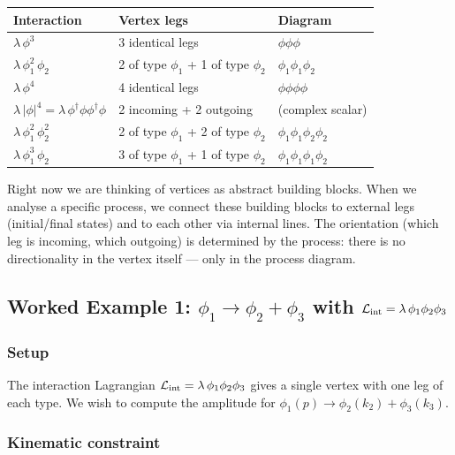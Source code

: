 \documentclass[../main.tex]{subfiles}
\begin{document}
\begin{center}
\renewcommand{\arraystretch}{1.4}
\begin{tabular}{lll}
  \toprule
  Interaction & Vertex legs & Diagram \\
  \midrule
  $\lambda\,\phi^3$ & 3 identical legs & $\phi\phi\phi$ \\
  $\lambda\,\phi_1^2\,\phi_2$ & 2 of type $\phi_1$ + 1 of type $\phi_2$ & $\phi_1\phi_1\phi_2$ \\
  $\lambda\,\phi^4$ & 4 identical legs & $\phi\phi\phi\phi$ \\
  $\lambda\,|\phi|^4 = \lambda\,\phi^\dagger\phi\phi^\dagger\phi$ & 2 incoming + 2 outgoing & (complex scalar) \\
  $\lambda\,\phi_1^2\,\phi_2^2$ & 2 of type $\phi_1$ + 2 of type $\phi_2$ & $\phi_1\phi_1\phi_2\phi_2$ \\
  $\lambda\,\phi_1^3\,\phi_2$ & 3 of type $\phi_1$ + 1 of type $\phi_2$ & $\phi_1\phi_1\phi_1\phi_2$ \\
  \bottomrule
\end{tabular}
\end{center}

\begin{remark}[Directionality]
Right now we are thinking of vertices as abstract building blocks.  When we analyse a specific process, we connect these building blocks to external legs (initial/final states) and to each other via internal lines.  The orientation (which leg is incoming, which outgoing) is determined by the process: there is no directionality in the vertex itself — only in the process diagram.
\end{remark}

\subsection*{Worked Example 1: $\phi_1 \to \phi_2 + \phi_3$ with $\mathcal{L}_{\rm int} = \lambda\,\phi_1\phi_2\phi_3$}

\subsubsection*{Setup}

The interaction Lagrangian $\mathcal{L}_{\rm int} = \lambda\,\phi_1\phi_2\phi_3$ gives a single vertex with one leg of each type.  We wish to compute the amplitude for $\phi_1(p) \to \phi_2(k_2) + \phi_3(k_3)$.

\subsubsection*{Kinematic constraint}
\end{document}
